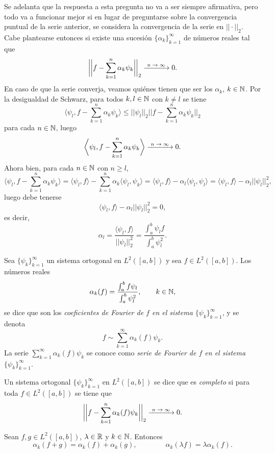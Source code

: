 \documentclass[a4paper, 12pt, extrafontsizes]{memoir}
\begin{document}
Se adelanta que la respuesta a esta pregunta no va a ser siempre afirmativa, pero todo va a funcionar mejor si en lugar de preguntarse sobre la convergencia puntual de la serie anterior, se considera la convergencia de la serie en $||\cdot||_2$. Cabe plantearse entonces si existe una sucesión $\{\alpha_k\}_{k=1}^\infty$ de números reales tal que
\[\biggl|\biggl|f-\sum_{k=1}^n \alpha_k\psi_k\biggr|\biggr|_2 \nconv 0.\]
En caso de que la serie converja, veamos quiénes tienen que ser los $\alpha_k$, $k \in \mathbb N$. Por la desigualdad de Schwarz, para todos $k,l\in \mathbb N$ con $k \neq l$ se tiene
\[\biggl\langle \psi_l, f-\sum_{k=1}^n\alpha_k\psi_k \biggr\rangle \leq ||\psi_l||_2\biggl|\biggl|f-\sum_{k=1}^n\alpha_k\psi_k\biggr|\biggr|_2\]
para cada $n \in \mathbb N$, luego 
\[\biggl\langle \psi_l, f-\sum_{k=1}^n\alpha_k\psi_k \biggr\rangle \nconv 0.\]
Ahora bien, para cada $n \in \mathbb N$ con $n \geq l$,
\[\biggl\langle \psi_l, f-\sum_{k=1}^n\alpha_k\psi_k \biggr\rangle = \langle \psi_l,f \rangle - \sum_{k=1}^n \alpha_k \langle\psi_l,\psi_k\rangle =  \langle \psi_l,f \rangle - \alpha_l \langle\psi_l,\psi_l\rangle =  \langle \psi_l,f \rangle - \alpha_l||\psi_l||_2^2,\]
luego debe tenerse
\[ \langle \psi_l,f \rangle - \alpha_l||\psi_l||_2^2 = 0,\]
es decir,
\[\alpha_l = \frac{\langle\psi_l,f\rangle}{||\psi_l||_2^2} = \frac{\int_a^b \psi_l f}{\int_a^b \psi_l^2}.\]

\begin{definition}
    Sea $\{\psi_k\}_{k=1}^\infty$ un sistema ortogonal en $L^2([a,b])$ y sea $f \in L^2([a,b])$. Los números reales
    \[\alpha_k(f) =  \frac{\int_a^b f\psi_l }{\int_a^b \psi_l^2}, \qquad k \in \mathbb N,\]
    se dice que son los \emph{coeficientes de Fourier de $f$ en el sistema $\{\psi_k\}_{k=1}^\infty$}, y se denota
    \[f \sim \sum_{k=1}^\infty \alpha_k(f)\psi_k.\]
    La serie $\sum_{k=1}^\infty \alpha_k(f)\psi_k$ se conoce como \emph{serie de Fourier de $f$ en el sistema $\{\psi_k\}_{k=1}^\infty$}.
\end{definition}

\begin{definition}
    Un sistema ortogonal $\{\psi_k\}_{k=1}^\infty$ en $L^2([a,b])$ se dice que es \emph{completo} si para toda $f \in L^2([a,b])$ se tiene que
    \[\biggl|\biggl|f-\sum_{k=1}^n \alpha_k(f)\psi_k\biggr|\biggr|_2 \nconv 0.\]
\end{definition}

\begin{proposition}
    Sean $f,g \in L^2([a,b])$, $\lambda \in \mathbb R$ y $k \in \mathbb N$. Entonces
    \[\alpha_k(f+g) = \alpha_k(f)+\alpha_k(g), \qquad \qquad \alpha_k(\lambda f) =\lambda\alpha_k(f). \]
\end{proposition}
\end{document}
